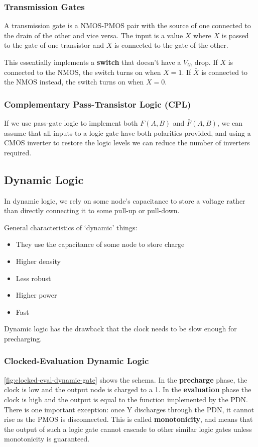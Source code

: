 \documentclass[11pt]{report}
\begin{document}
\subsubsection{Transmission Gates}
A transmission gate is a NMOS-PMOS pair with the source of one connected to the drain of the other and vice versa. The input is a value $X$ where $X$ is passed to the gate of one transistor and $\bar{X}$ is connected to the gate of the other.

This essentially implements a \textbf{switch} that doesn't have a $V_{th}$ drop. If $X$ is connected to the NMOS, the switch turns on when $X=1$. If $\bar{X}$ is connected to the NMOS instead, the switch turns on when $X=0$.

\subsubsection{Complementary Pass-Transistor Logic (CPL)}
If we use pass-gate logic to implement both $F(A,B)$ and $\bar{F}(A,B)$, we can assume that all inputs to a logic gate have both polarities provided, and using a CMOS inverter to restore the logic levels we can reduce the number of inverters required.

\subsection{Dynamic Logic}
In dynamic logic, we rely on some node's capacitance to store a voltage rather than directly connecting it to some pull-up or pull-down.

General characteristics of `dynamic' things:
\begin{itemize}
	\item They use the capacitance of some node to store charge
	\item Higher density
	\item Less robust
	\item Higher power
	\item Fast
\end{itemize}

Dynamic logic has the drawback that the clock needs to be slow enough for precharging.

\subsubsection{Clocked-Evaluation Dynamic Logic}

\autoref{fig:clocked-eval-dynamic-gate} shows the schema. In the \textbf{precharge} phase, the clock is low and the output node is charged to a 1. In the \textbf{evaluation} phase the clock is high and the output is equal to the function implemented by the PDN. There is one important exception: once Y discharges through the PDN, it cannot rise as the PMOS is disconnected. This is called \textbf{monotonicity}, and means that the output of such a logic gate cannot cascade to other similar logic gates unless monotonicity is guaranteed.
\end{document}
